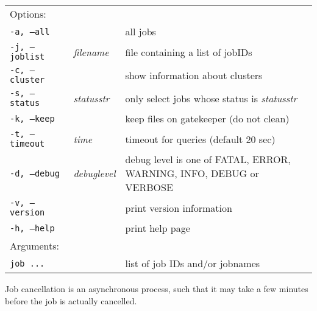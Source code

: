 \hspace*{0.5cm}
\begin{shaded}
\end{shaded}
\begin{longtable}{llp{8cm}}
   Options:&&\\
   \texttt{-a, --all}& & all jobs\\
   \texttt{-j, --joblist}& \textit{filename} & file containing a list of jobIDs\\
   \texttt{-c, --cluster}& & show information about clusters\\
   \texttt{-s, --status}& \textit{statusstr} &only select jobs whose status is \textit{statusstr}\\
   \texttt{-k, --keep}& & keep files on gatekeeper (do not clean)\\
   \texttt{-t, --timeout}& \textit{time} & timeout for queries (default 20 sec)\\
   \texttt{-d, --debug}& \textit{debuglevel}&debug level is one of  FATAL, ERROR, WARNING, INFO, DEBUG or VERBOSE\\
   \texttt{-v, --version}& & print version information\\
   \texttt{-h, --help}& & print help page\\
   Arguments:&&\\
   \texttt{job ...} && list of job IDs and/or jobnames\\
\end{longtable}

\begin{framed}
   Job cancellation is an asynchronous process, such that it
   may take a few minutes before the job is actually cancelled.
\end{framed}

